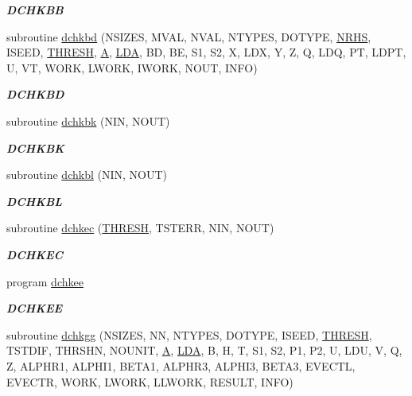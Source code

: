 \begin{DoxyCompactItemize}
\begin{DoxyCompactList}\small\item\em {\bfseries D\+C\+H\+K\+B\+B} \end{DoxyCompactList}\item 
subroutine \hyperlink{group__double__eig_ga04ab01e2495d343417e614aeec1571f1}{dchkbd} (N\+S\+I\+Z\+E\+S, M\+V\+A\+L, N\+V\+A\+L, N\+T\+Y\+P\+E\+S, D\+O\+T\+Y\+P\+E, \hyperlink{example__user_8c_aa0138da002ce2a90360df2f521eb3198}{N\+R\+H\+S}, I\+S\+E\+E\+D, \hyperlink{zlaqgs_8c_a0656018abfc9fa2821827415f5d5ea57}{T\+H\+R\+E\+S\+H}, \hyperlink{classA}{A}, \hyperlink{example__user_8c_ae946da542ce0db94dced19b2ecefd1aa}{L\+D\+A}, B\+D, B\+E, S1, S2, X, L\+D\+X, Y, Z, Q, L\+D\+Q, P\+T, L\+D\+P\+T, U, V\+T, W\+O\+R\+K, L\+W\+O\+R\+K, I\+W\+O\+R\+K, N\+O\+U\+T, I\+N\+F\+O)
\begin{DoxyCompactList}\small\item\em {\bfseries D\+C\+H\+K\+B\+D} \end{DoxyCompactList}\item 
subroutine \hyperlink{group__double__eig_ga8bcf76f5f33d2f4905f61284d938d3e4}{dchkbk} (N\+I\+N, N\+O\+U\+T)
\begin{DoxyCompactList}\small\item\em {\bfseries D\+C\+H\+K\+B\+K} \end{DoxyCompactList}\item 
subroutine \hyperlink{group__double__eig_gad48bef9c53d7828ee7b25c9ccf56fed9}{dchkbl} (N\+I\+N, N\+O\+U\+T)
\begin{DoxyCompactList}\small\item\em {\bfseries D\+C\+H\+K\+B\+L} \end{DoxyCompactList}\item 
subroutine \hyperlink{group__double__eig_ga909f6f89527e6667b8e49034a692f7b4}{dchkec} (\hyperlink{zlaqgs_8c_a0656018abfc9fa2821827415f5d5ea57}{T\+H\+R\+E\+S\+H}, T\+S\+T\+E\+R\+R, N\+I\+N, N\+O\+U\+T)
\begin{DoxyCompactList}\small\item\em {\bfseries D\+C\+H\+K\+E\+C} \end{DoxyCompactList}\item 
program \hyperlink{group__double__eig_ga8356beeda2da8d0fef89ccb4bc414d5a}{dchkee}
\begin{DoxyCompactList}\small\item\em {\bfseries D\+C\+H\+K\+E\+E} \end{DoxyCompactList}\item 
subroutine \hyperlink{group__double__eig_ga90e3a487742ba9acb39f783362b5b300}{dchkgg} (N\+S\+I\+Z\+E\+S, N\+N, N\+T\+Y\+P\+E\+S, D\+O\+T\+Y\+P\+E, I\+S\+E\+E\+D, \hyperlink{zlaqgs_8c_a0656018abfc9fa2821827415f5d5ea57}{T\+H\+R\+E\+S\+H}, T\+S\+T\+D\+I\+F, T\+H\+R\+S\+H\+N, N\+O\+U\+N\+I\+T, \hyperlink{classA}{A}, \hyperlink{example__user_8c_ae946da542ce0db94dced19b2ecefd1aa}{L\+D\+A}, B, H, T, S1, S2, P1, P2, U, L\+D\+U, V, Q, Z, A\+L\+P\+H\+R1, A\+L\+P\+H\+I1, B\+E\+T\+A1, A\+L\+P\+H\+R3, A\+L\+P\+H\+I3, B\+E\+T\+A3, E\+V\+E\+C\+T\+L, E\+V\+E\+C\+T\+R, W\+O\+R\+K, L\+W\+O\+R\+K, L\+L\+W\+O\+R\+K, R\+E\+S\+U\+L\+T, I\+N\+F\+O)

\end{DoxyCompactItemize}
